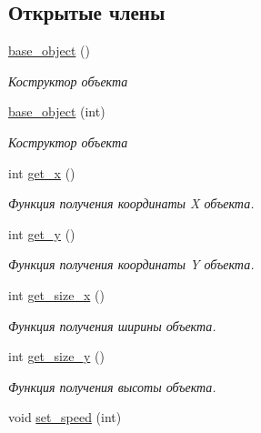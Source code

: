 \subsection*{Открытые члены}
\begin{DoxyCompactItemize}
\item 
\mbox{\label{classbase__object_a6c3928ac6aaf6b645c18ea8b7717dbd6}} 
\mbox{\hyperlink{classbase__object_a6c3928ac6aaf6b645c18ea8b7717dbd6}{base\+\_\+object}} ()
\begin{DoxyCompactList}\small\item\em Коструктор объекта \end{DoxyCompactList}\item 
\mbox{\hyperlink{classbase__object_aae443eac7c3fe83ea76ce4006359aaa7}{base\+\_\+object}} (int)
\begin{DoxyCompactList}\small\item\em Коструктор объекта \end{DoxyCompactList}\item 
int \mbox{\hyperlink{classbase__object_a53e9ce3dd05e9de706e05a5ec9df8d1e}{get\+\_\+x}} ()
\begin{DoxyCompactList}\small\item\em Функция получения координаты X объекта. \end{DoxyCompactList}\item 
int \mbox{\hyperlink{classbase__object_ad1ff677f0809e24496f87c27ea2c65ec}{get\+\_\+y}} ()
\begin{DoxyCompactList}\small\item\em Функция получения координаты Y объекта. \end{DoxyCompactList}\item 
int \mbox{\hyperlink{classbase__object_a9b018abfe21170353c163cad9511f02c}{get\+\_\+size\+\_\+x}} ()
\begin{DoxyCompactList}\small\item\em Функция получения ширины объекта. \end{DoxyCompactList}\item 
int \mbox{\hyperlink{classbase__object_a58391e1cc3093e8b6ee1aaeadd8335d5}{get\+\_\+size\+\_\+y}} ()
\begin{DoxyCompactList}\small\item\em Функция получения высоты объекта. \end{DoxyCompactList}\item 
void \mbox{\hyperlink{classbase__object_a6aa28faa9734744b5992da58121e6095}{set\+\_\+speed}} (int)

\end{DoxyCompactItemize}
